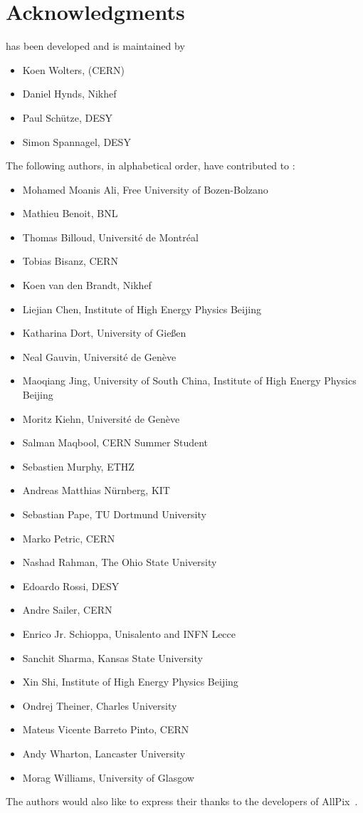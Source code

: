 \chapter{Acknowledgments}

\apsq has been developed and is maintained by

\begin{itemize}
\item Koen Wolters, (CERN)
\item Daniel Hynds, Nikhef
\item Paul Schütze, DESY
\item Simon Spannagel, DESY
\end{itemize}

The following authors, in alphabetical order, have contributed to \apsq:

\begin{itemize}
\item Mohamed Moanis Ali, Free University of Bozen-Bolzano
\item Mathieu Benoit, BNL
\item Thomas Billoud, Université de Montréal
\item Tobias Bisanz, CERN
\item Koen van den Brandt, Nikhef
\item Liejian Chen, Institute of High Energy Physics Beijing
\item Katharina Dort, University of Gie\ss en
\item Neal Gauvin, Université de Genève
\item Maoqiang Jing, University of South China, Institute of High Energy Physics Beijing
\item Moritz Kiehn, Université de Genève
\item Salman Maqbool, CERN Summer Student
\item Sebastien Murphy, ETHZ
\item Andreas Matthias Nürnberg, KIT
\item Sebastian Pape, TU Dortmund University
\item Marko Petric, CERN
\item Nashad Rahman, The Ohio State University
\item Edoardo Rossi, DESY
\item Andre Sailer, CERN
\item Enrico Jr. Schioppa, Unisalento and INFN Lecce
\item Sanchit Sharma, Kansas State University
\item Xin Shi, Institute of High Energy Physics Beijing
\item Ondrej Theiner, Charles University
\item Mateus Vicente Barreto Pinto, CERN
\item Andy Wharton, Lancaster University
\item Morag Williams, University of Glasgow
\end{itemize}

The authors would also like to express their thanks to the developers of AllPix~\cite{ap1wiki,ap1git}.
